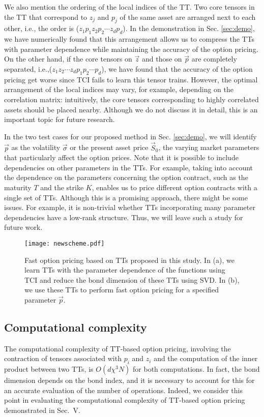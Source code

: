 We also mention the ordering of the local indices of the TT. 
Two core tensors in the TT that correspond to $z_j$ and $p_j$ of the same asset are arranged next to each other, i.e., the order is ($z_1 p_1 z_2 p_2 \cdots z_d p_d$). 
In the demonstration in Sec. \ref{sec:demo}, we have numerically found that this arrangement allows us to compress the TTs with parameter dependence while maintaining the accuracy of the option pricing. 
On the other hand, if the core tensors on $\vec{z}$ and those on $\vec{p}$ are completely separated, i.e.,($z_1 z_2 \cdots z_d p_1 p_2 \cdots p_d$), we have found that the accuracy of the option pricing get worse since TCI fails to learn this tensor trains. 
However, the optimal arrangement of the local indices may vary, for example, depending on the correlation matrix: intuitively, the core tensors corresponding to highly correlated assets should be placed nearby.
Although we do not discuss it in detail, this is an important topic for future research.



In the two test cases for our proposed method in Sec. \ref{sec:demo}, we will identify $\vec{p}$ as the volatility $\vec{\sigma}$ or the present asset price $\vec{S}_0$, the varying market parameters that particularly affect the option prices. 
Note that it is possible to include dependencies on other parameters in the TTs.
For example, taking into account the dependence on the parameters concerning the option contract, such as the maturity $T$ and the strike $K$, enables us to price different option contracts with a single set of TTs.
Although this is a promising approach, there might be some issues. For example, it is non-trivial whether TTs incorporating many parameter dependencies have a low-rank structure. Thus, we will leave such a study for future work.

\begin{figure*}[ht]
    \centering
        \texttt{[image: newscheme.pdf]}
        \caption{Fast option pricing based on TTs proposed in this study.
    In (a), we learn TTs with the parameter dependence of the functions using TCI and reduce the bond dimension of these TTs using SVD.
    In (b), we use these TTs to perform fast option pricing for a specified parameter $\vec{p}$.}
\label{fig:new_scheme}
\end{figure*}


\subsection{Computational complexity}
The computational complexity of TT-based option pricing, involving the contraction of tensors associated with $p_i$ and $z_{i}$ and the computation of the inner product between two TTs, is $O(d \chi^{3} N)$ for both computations.
In fact, the bond dimension depends on the bond index, and it is necessary to account for this for an accurate evaluation of the number of operations. 
Indeed, we consider this point in evaluating the computational complexity of TT-based option pricing demonstrated in Sec.~V.

